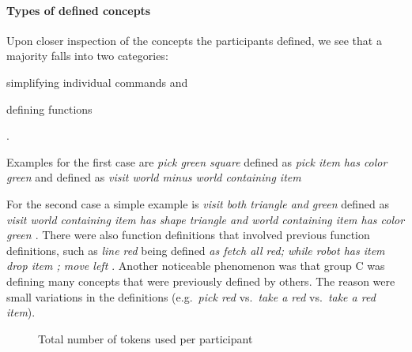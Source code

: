 \paragraph*{\textbf{Types of defined concepts}} 
Upon closer inspection of the concepts the participants defined, we see that a majority falls into two categories: 
\begin{inparaenum}[(1)]
\item simplifying individual commands and
\item defining functions 
\end{inparaenum}.

Examples for the first case are  
\textit{pick green square} defined as \textit{pick item has color green} and 
 defined as \textit{visit world minus {world containing item}}

For the second case a simple example is 
\textit{visit both triangle and green
} defined as \textit{ visit { { world containing item has shape triangle } and { world containing item has color green } }}. There were also function definitions that involved previous function definitions, such as \textit{line red} being defined \textit{as fetch all red; while { robot has item } { drop item ; move left }}.  Another noticeable phenomenon was that group C was defining many concepts that were previously defined by others. The reason were small variations in the definitions (e.g.\ \emph{pick red} vs.\ \emph{take a red} vs.\ \emph{take a red item}). 


 


\begin{figure}[t!]
	\caption{Total number of tokens used per participant}
	\end{figure}



